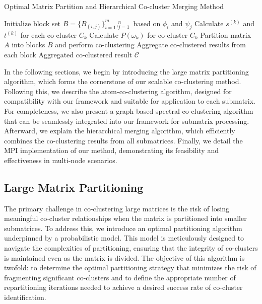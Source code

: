 \documentclass[journal]{IEEEtran}
\begin{document}
\begin{algorithm}[!t]
  \caption{Optimal Matrix Partition and Hierarchical Co-cluster Merging Method}\label{alg:method}
  \begin{algorithmic}[1]
    \STATE Initialize block set $B = \{B_{(i,j)}\}_{i=1}^m,_{j=1}^n$ based on $\phi_i$ and $\psi_j$
    \STATE Calculate $s^{(k)}$ and $t^{(k)}$ for each co-cluster $C_k$
    \STATE Calculate $P(\omega_k)$ for co-cluster $C_k$
    \STATE Partition matrix $A$ into blocks $B$ and perform co-clustering
    \STATE Aggregate co-clustered results from each block
    \ENDIF
    \ENDFOR
    \RETURN Aggregated co-clustered result $\mathcal{C}$
  \end{algorithmic}
\end{algorithm}

In the following sections, we begin by introducing the large matrix partitioning algorithm, which forms the cornerstone of our scalable co-clustering method. Following this, we describe the atom-co-clustering algorithm, designed for compatibility with our framework and suitable for application to each submatrix. For completeness, we also present a graph-based spectral co-clustering algorithm that can be seamlessly integrated into our framework for submatrix processing. Afterward, we explain the hierarchical merging algorithm, which efficiently combines the co-clustering results from all submatrices. Finally, we detail the MPI implementation of our method, demonstrating its feasibility and effectiveness in multi-node scenarios.

\subsection{Large Matrix Partitioning}

The primary challenge in co-clustering large matrices is the risk of losing meaningful co-cluster relationships when the matrix is partitioned into smaller submatrices. To address this, we introduce an optimal partitioning algorithm underpinned by a probabilistic model. This model is meticulously designed to navigate the complexities of partitioning, ensuring that the integrity of co-clusters is maintained even as the matrix is divided. The objective of this algorithm is twofold: to determine the optimal partitioning strategy that minimizes the risk of fragmenting significant co-clusters and to define the appropriate number of repartitioning iterations needed to achieve a desired success rate of co-cluster identification.
\end{document}
